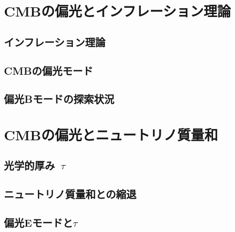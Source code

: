 \section{CMBの偏光とインフレーション理論}

\subsection{インフレーション理論}

\subsection{CMBの偏光モード}

\subsection{偏光Bモードの探索状況}

\section{CMBの偏光とニュートリノ質量和}

\subsection{光学的厚み~$\tau$}

\subsection{ニュートリノ質量和との縮退}

\subsection{偏光Eモードと$\tau$}
\label{E_and_tau}
